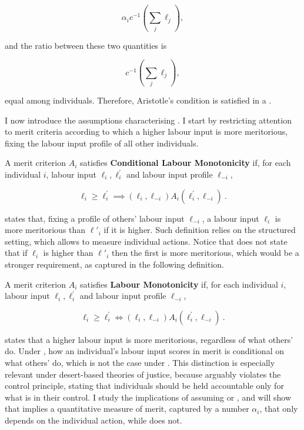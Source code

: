 \[ \alpha_i c^{-1}\left(\sum_{j} \ell_j\right) , \]

and the ratio between these two quantities is

\[ c^{-1}\left(\sum_{j} \ell_j\right) , \]

equal among individuals. Therefore, Aristotle's condition is satisfied in a .

I now introduce the assumptions characterising . I start by restricting attention to merit criteria according to which a higher labour input is more meritorious, fixing the labour input profile of all other individuals.

\begin{definition}\label{def:mono}
	A merit criterion \( A_i \) satisfies \textbf{Conditional Labour Monotonicity} if, for each individual \( i \), labour input \( \ell_i, \ell^{\prime}_{i} \) and labour input profile \( \ell_{-i} \),

	\[ \ell_i \geq \ell_i^{\prime} \implies ( \ell_i, \ell_{-i} ) A_i ( \ell^{\prime}_i, \ell_{-i} ) \: .\]
\end{definition}

 states that, fixing a profile of others' labour input \( \ell_{-i} \), a labour input \( \ell_i \) is more meritorious than \( \ell'_i \) if it is higher. Such definition relies on the structured setting, which allows to measure individual actions. Notice that  does not state that if \( \ell_i \) is higher than \( \ell'_i \) then the first is more meritorious, which would be a stronger requirement, as captured in the following definition.

\begin{definition}\label{def:mono'}
	A merit criterion \( A_i \) satisfies \textbf{Labour Monotonicity} if, for each individual \( i \), labour input \( \ell_i, \ell^{\prime}_{i} \) and labour input profile \( \ell_{-i} \),

	\[ \ell_i \geq \ell_i^{\prime} \iff ( \ell_i, \ell_{-i} ) A_i ( \ell^{\prime}_i, \ell_{-i} ) \: .\]
\end{definition}

 states that a higher labour input is more meritorious, regardless of what others' do. Under , how an individual's labour input scores in merit is conditional on what others' do, which is not the case under . This distinction is especially relevant under desert-based theories of justice, because  arguably violates the control principle, stating that individuals should be held accountable only for what is in their control. I study the implications of assuming  or , and will show that  implies a quantitative measure of merit, captured by a number \( \alpha_i \), that only depends on the individual action, while  does not.

